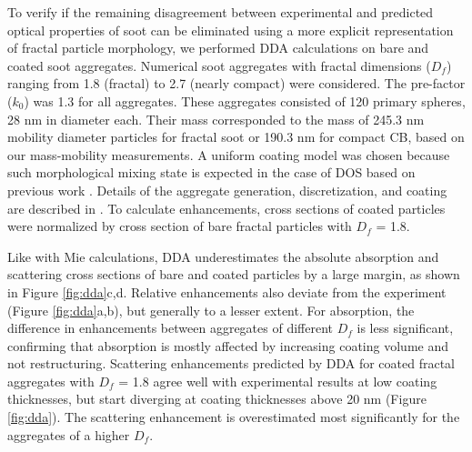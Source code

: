 To verify if the remaining disagreement between experimental and predicted optical properties of soot can be eliminated using a more explicit representation of fractal particle morphology, we performed DDA calculations on bare and coated soot aggregates. Numerical soot aggregates with fractal dimensions ($D_f$) ranging from 1.8 (fractal) to 2.7 (nearly compact) were considered. The pre-factor ($k_0$) was 1.3 for all aggregates. These aggregates consisted of 120 primary spheres, 28 nm in diameter each. Their mass corresponded to the mass of 245.3 nm mobility diameter particles for fractal soot or 190.3 nm for compact CB, based on our mass-mobility measurements. A uniform coating model was chosen because such morphological mixing state is expected in the case of DOS based on previous work \citep{RN70}. Details of the aggregate generation, discretization, and coating are described in \citet{RN22}. To calculate enhancements, cross sections of coated particles were normalized by cross section of bare fractal particles with $D_f$ = 1.8.

Like with Mie calculations, DDA underestimates the absolute absorption and scattering cross sections of bare and coated particles by a large margin, as shown in Figure \ref{fig:dda}c,d. Relative enhancements also deviate from the experiment (Figure \ref{fig:dda}a,b), but generally to a lesser extent. For absorption, the difference in enhancements between aggregates of different $D_f$ is less significant, confirming that absorption is mostly affected by increasing coating volume and not restructuring. Scattering enhancements predicted by DDA for coated fractal aggregates with $D_f$ = 1.8 agree well with experimental results at low coating thicknesses, but start diverging at coating thicknesses above 20 nm (Figure \ref{fig:dda}). The scattering enhancement is overestimated most significantly for the aggregates of a higher $D_f$.


